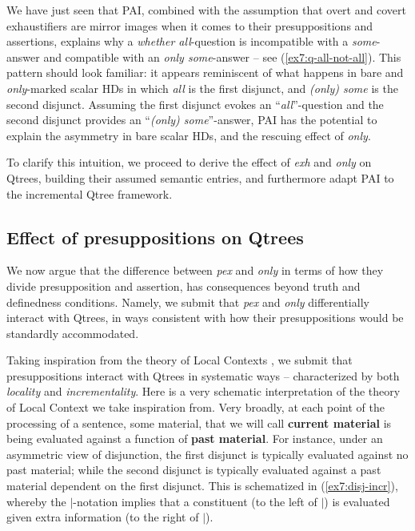 We have just seen that PAI, combined with the assumption that overt and covert exhaustifiers are mirror images when it comes to their presuppositions and assertions, explains why a \textit{whether all}-question is incompatible with a \textit{some}-answer and compatible with an \textit{only some}-answer -- see (\ref{ex7:q-all-not-all}). This pattern should look familiar: it appears reminiscent of what happens in bare and \textit{only}-marked scalar HDs in which \textit{all} is the first disjunct, and \textit{(only) some} is the second disjunct. Assuming the first disjunct evokes an ``\textit{all}''-question and the second disjunct provides an ``\textit{(only) some}''-answer, PAI has the potential to explain the asymmetry in bare scalar HDs, and the rescuing effect of \textit{only}.

To clarify this intuition, we proceed to derive the effect of \textit{exh} and \textit{only} on Qtrees, building their assumed semantic entries, and furthermore adapt PAI to the incremental Qtree framework.


\subsection{Effect of presuppositions on Qtrees}

We now argue that the difference between \textit{pex} and \textit{only} in terms of how they divide presupposition and assertion, has consequences beyond truth and definedness conditions. Namely, we submit that \textit{pex} and \textit{only} differentially interact with Qtrees, in ways consistent with how their presuppositions would be standardly accommodated.

Taking inspiration from the theory of Local Contexts \citep{Schlenker2009}, we submit that presuppositions interact with Qtrees in systematic ways -- characterized by both \textit{locality} and \textit{incrementality}. Here is a very schematic interpretation of the theory of Local Context we take inspiration from. Very broadly, at each point of the processing of a sentence, some material, that we will call \textbf{current material} is being evaluated against a function of \textbf{past material}. For instance, under an asymmetric view of disjunction, the first disjunct is typically evaluated against no past material; while the second disjunct is typically evaluated against a past material dependent on the first disjunct. This is schematized in (\ref{ex7:disj-incr}), whereby the $|$-notation implies that a constituent (to the left of $|$) is evaluated given extra information (to the right of $|$).

